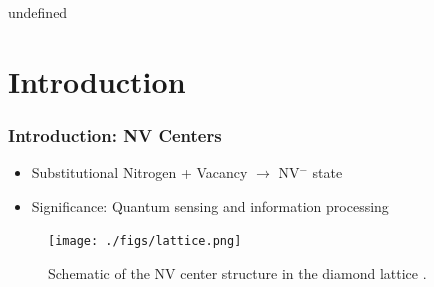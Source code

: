 undefined


\begin{frame}
\titlepage %
\end{frame}


\section{Introduction}

\begin{frame}
    \frametitle{Introduction: NV Centers}
    \begin{itemize}
        \item Substitutional Nitrogen + Vacancy $\rightarrow$ NV$^{-}$ state \cite{doherty2013nitrogen}
        \item Significance: Quantum sensing and information processing
    \end{itemize}
    \begin{figure}
        \centering
        \texttt{[image: ./figs/lattice.png]} %
        \caption{Schematic of the NV center structure in the diamond lattice \cite{doherty2013nitrogen}.}
        \label{fig:nv_structure_pres}
    \end{figure}
\end{frame}

